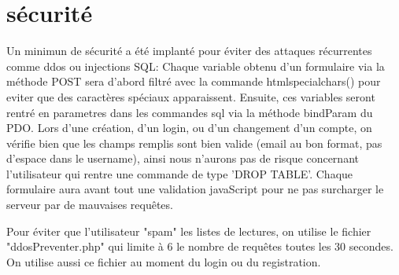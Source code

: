 \section{sécurité}
    Un minimun de sécurité a été implanté pour éviter des attaques récurrentes comme ddos ou injections SQL:\newline
Chaque variable obtenu d'un formulaire via la méthode POST sera d'abord filtré avec la commande htmlspecialchars() pour eviter que des caractères spéciaux apparaissent. Ensuite, ces variables seront rentré en parametres dans les commandes sql via la méthode bindParam du PDO.\newline
Lors d'une création, d'un login, ou d'un changement d'un compte, on vérifie bien que les champs remplis sont bien valide (email au bon format, pas d'espace dans le username), ainsi nous n'aurons pas de risque concernant l'utilisateur qui rentre une commande de type 'DROP TABLE'.\newline
Chaque formulaire aura avant tout une validation javaScript pour ne pas surcharger le serveur par de mauvaises requêtes.\newline\newline

Pour éviter que l'utilisateur "spam" les listes de lectures, on utilise le fichier "ddosPreventer.php" qui limite à 6 le nombre de requêtes toutes les 30 secondes. On utilise aussi ce fichier au moment du login ou du registration. 

